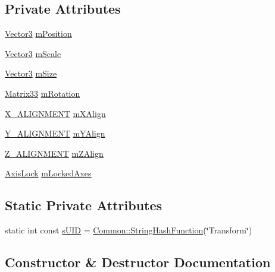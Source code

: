 \subsection*{Private Attributes}
\begin{DoxyCompactItemize}
\item 
\hyperlink{structVector3}{Vector3} \hyperlink{classTransform_a975e3ed410b66254086da111e258886c}{m\+Position}
\item 
\hyperlink{structVector3}{Vector3} \hyperlink{classTransform_a102176b78b2592b281d66788c39433b7}{m\+Scale}
\item 
\hyperlink{structVector3}{Vector3} \hyperlink{classTransform_ad52265c4e89c167205c72dcd7cd5d696}{m\+Size}
\item 
\hyperlink{structMatrix33}{Matrix33} \hyperlink{classTransform_af3d53ed29845812548669e5b52a47086}{m\+Rotation}
\item 
\hyperlink{MathExt_8h_a0792b703e89c99d4c39f13e093992576}{X\+\_\+\+A\+L\+I\+G\+N\+M\+E\+NT} \hyperlink{classTransform_a28f4dc98598dd8f150b26a7542c25c33}{m\+X\+Align}
\item 
\hyperlink{MathExt_8h_a0de91f93b1c4a18a768f6070ddc579b4}{Y\+\_\+\+A\+L\+I\+G\+N\+M\+E\+NT} \hyperlink{classTransform_a72a2c6c9b517604089a3d8f23ccde296}{m\+Y\+Align}
\item 
\hyperlink{MathExt_8h_a3f663abe91c584f6ee19cfe53b0ad568}{Z\+\_\+\+A\+L\+I\+G\+N\+M\+E\+NT} \hyperlink{classTransform_a758b797e43f61a2c01820782ff1705f0}{m\+Z\+Align}
\item 
\hyperlink{Transform_8h_a8e6f13c41567abc23d55b0843251a8d8}{Axis\+Lock} \hyperlink{classTransform_ac8c97858398bf06f822728693374d301}{m\+Locked\+Axes}
\end{DoxyCompactItemize}
\subsection*{Static Private Attributes}
\begin{DoxyCompactItemize}
\item 
static int const \hyperlink{classTransform_aa46d87cf37253c77a12a722501c7077c}{s\+U\+ID} = \hyperlink{namespaceCommon_a994c43a8ea7b03968186a635687a6521}{Common\+::\+String\+Hash\+Function}(\char`\"{}Transform\char`\"{})
\end{DoxyCompactItemize}


\subsection{Constructor \& Destructor Documentation}
